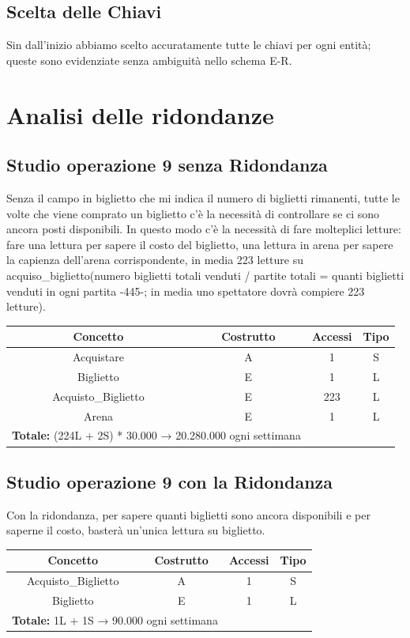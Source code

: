 \documentclass[a4paper,12pt]{report}
\begin{document}
\subsection*{Scelta delle Chiavi}
Sin dall'inizio abbiamo scelto accuratamente tutte le chiavi per ogni entità; queste sono evidenziate senza ambiguità nello schema E-R.
\section{Analisi delle ridondanze}
\subsection*{Studio operazione 9 senza Ridondanza}
Senza il campo in biglietto che mi indica il numero di biglietti rimanenti, tutte le volte che viene comprato un biglietto c'è la necessità di controllare se ci sono ancora posti disponibili. In questo modo c'è la necessità di fare molteplici letture: fare una lettura per sapere il costo del biglietto, una lettura in arena per sapere la capienza dell'arena corrispondente, in media 223 letture su acquiso\_biglietto(numero biglietti totali venduti / partite totali = quanti biglietti venduti in ogni partita -445-; in media uno spettatore dovrà compiere 223 letture).
\begin{center}
	\begin{tabular}{|c|c|c|c|}
		\hline\rowcolor{pink}
		Concetto & Costrutto & Accessi & Tipo\\
		\hline\hline		
		Acquistare & A & 1 & S\\
		Biglietto & E & 1 & L\\
		Acquisto\_Biglietto & E & 223 & L\\
		Arena & E & 1 & L\\
		\hline
		\hline
		\multicolumn{2}{l}{%
			\textbf{Totale:} (224L + 2S) * 30.000 → 20.280.000 ogni settimana} \\
		\hline
	\end{tabular}
\end{center}
\subsection*{Studio operazione 9 con la Ridondanza}
Con la ridondanza, per sapere quanti biglietti sono ancora disponibili e per saperne il costo, basterà un'unica lettura su biglietto.
\begin{center}
	\begin{tabular}{|c|c|c|c|}
		\hline\rowcolor{pink}
		Concetto & Costrutto & Accessi & Tipo\\
		\hline\hline		
		Acquisto\_Biglietto & A & 1 & S\\
		Biglietto & E & 1 & L\\		
		\hline
		\hline
		\multicolumn{2}{l}{%
			\textbf{Totale:} 1L + 1S → 90.000 ogni settimana} \\
		\hline
	\end{tabular}
\end{center}
\end{document}

